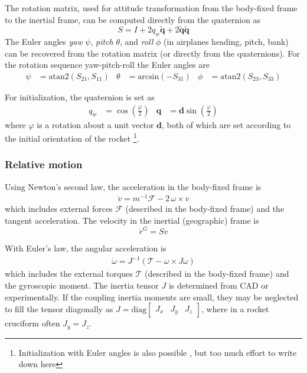 The rotation matrix, used for attitude transformation from the body-fixed frame to the inertial frame, can be computed directly from the quaternion \cite{zipfel2007, schiehlen2017} as
\begin{equation}
    S = I + 2 q_w \bm{\tilde q} + 2 \bm{\tilde q} \bm{\tilde q} \label{eq:rotationmatrix}
\end{equation}
The Euler angles \textit{yaw} $\psi$, \textit{pitch} $\theta$, and \textit{roll} $\phi$ (in airplanes heading, pitch, bank) can be recovered from the rotation matrix (or directly from the quaternions). 
For the rotation sequence yaw-pitch-roll the Euler angles are 
\begin{align}
    \psi &= \mathrm{atan2}(S_{21}, S_{11}) &
    \theta &= \mathrm{arcsin}(-S_{31}) &
    \phi &= \mathrm{atan2}(S_{23}, S_{33}) 
\end{align}


For initialization, the quaternion is set as
\begin{align}
    q_w &= \cos(\frac{\varphi}{2}) 
    &
    \bm q &= \bm d \sin(\frac{\varphi}{2})
\end{align}
where $\varphi$ is a rotation about a unit vector $\bm d$, both of which are set according to the initial orientation of the rocket \footnote{Initialization with Euler angles is also possible \cite[p. 126]{zipfel2007}, but too much effort to write down here}.

\subsubsection{Relative motion}
Using Newton's second law, the acceleration in the body-fixed frame is \cite{zipfel2007, schiehlen2017}
\begin{align}
    \dot v = m^{-1} \mathcal{F} - 2 \, \omega \times v
    \label{eq:model-vel-deriv}
\end{align}
which includes external forces $\mathcal{F}$ (described in the body-fixed frame) and the tangent acceleration.
The velocity in the inertial (geographic) frame is \cite{zipfel2007}
\begin{equation}
    \dot r^G = S v
    \label{eq:model-pos-deriv}
\end{equation}

With Euler's law, the angular acceleration is \cite{zipfel2007, schiehlen2017}
\begin{align}
   \dot \omega = J^{-1} (\mathcal{T} - \omega \times J \omega)
   \label{eq:model-rate-deriv}
\end{align}
which includes the external torques $\mathcal{T}$ (described in the body-fixed frame) and the gyroscopic moment.
The inertia tensor $J$ is determined from CAD or experimentally. If the coupling inertia moments are small, they may be neglected to fill the tensor diagonally as $J = \text{diag}\begin{bmatrix} J_x & J_y & J_z \end{bmatrix}$, where in a rocket cruciform often $J_y = J_z$.

